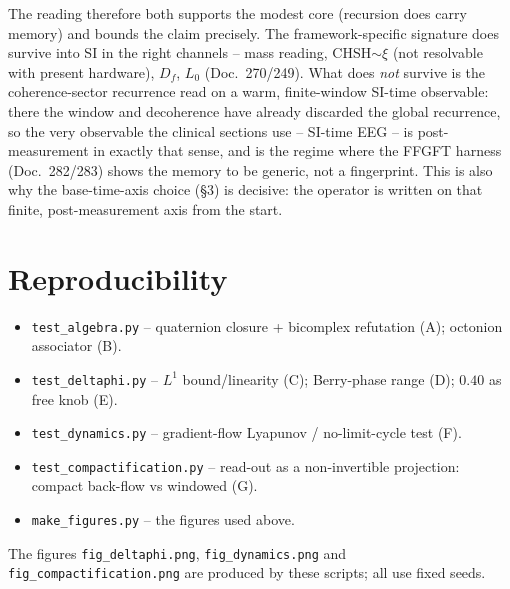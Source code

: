 The reading therefore both supports the modest core (recursion does carry memory) and
bounds the claim precisely. The framework-specific signature does survive into SI in the
right channels -- mass reading, CHSH$\sim\xi$ (not resolvable with present hardware), $D_f$, $L_0$ (Doc.~270/249). What does
\emph{not} survive is the coherence-sector recurrence read on a warm, finite-window SI-time
observable: there the window and decoherence have already discarded the global recurrence,
so the very observable the clinical sections use -- SI-time EEG -- is post-measurement in
exactly that sense, and is the regime where the FFGFT harness (Doc.~282/283) shows the
memory to be generic, not a fingerprint. This is also why the base-time-axis choice (\S3)
is decisive: the operator is written on that finite, post-measurement axis from the start.

\section{Reproducibility}
\begin{itemize}
\item \texttt{test\_algebra.py} -- quaternion closure + bicomplex refutation (A); octonion associator (B).
\item \texttt{test\_deltaphi.py} -- $L^1$ bound/linearity (C); Berry-phase range (D); $0.40$ as free knob (E).
\item \texttt{test\_dynamics.py} -- gradient-flow Lyapunov / no-limit-cycle test (F).
\item \texttt{test\_compactification.py} -- read-out as a non-invertible projection: compact back-flow vs windowed (G).
\item \texttt{make\_figures.py} -- the figures used above.
\end{itemize}
The figures \texttt{fig\_deltaphi.png}, \texttt{fig\_dynamics.png} and
\texttt{fig\_compactification.png} are produced by these scripts; all use fixed seeds.
